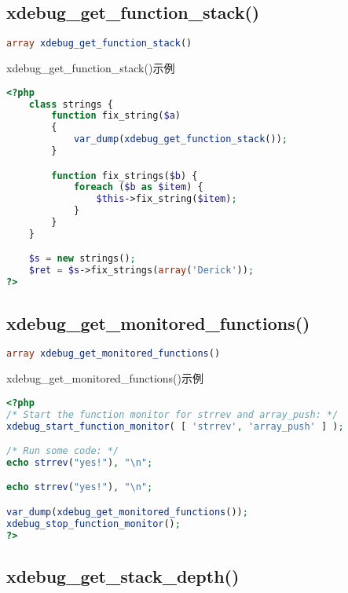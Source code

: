 \subsection{xdebug\_get\_function\_stack()}


\begin{lstlisting}[language=PHP]
array xdebug_get_function_stack()
\end{lstlisting}

\begin{example}
xdebug\_get\_function\_stack()示例
\begin{lstlisting}[language=PHP]
<?php
    class strings {
        function fix_string($a)
        {
            var_dump(xdebug_get_function_stack());
        }

        function fix_strings($b) {
            foreach ($b as $item) {
                $this->fix_string($item);
            }
        }
    }

    $s = new strings();
    $ret = $s->fix_strings(array('Derick'));
?>
\end{lstlisting}
\end{example}

\subsection{xdebug\_get\_monitored\_functions()}


\begin{lstlisting}[language=PHP]
array xdebug_get_monitored_functions()
\end{lstlisting}




\begin{example}
xdebug\_get\_monitored\_functions()示例
\begin{lstlisting}[language=PHP]
<?php
/* Start the function monitor for strrev and array_push: */
xdebug_start_function_monitor( [ 'strrev', 'array_push' ] );

/* Run some code: */
echo strrev("yes!"), "\n";

echo strrev("yes!"), "\n";

var_dump(xdebug_get_monitored_functions());
xdebug_stop_function_monitor();
?>  
\end{lstlisting}
\end{example}

\subsection{xdebug\_get\_stack\_depth()}


